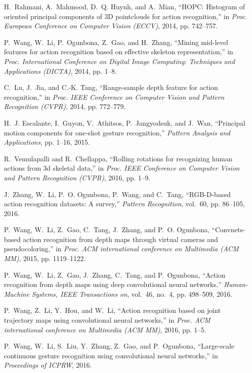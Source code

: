 \documentclass[10pt, a4paper, conference]{IEEEtran}
\begin{document}
\begin{thebibliography}{10}
H.~Rahmani, A.~Mahmood, D.~Q. Huynh, and A.~Mian, ``{HOPC}: Histogram of
  oriented principal components of {3D} pointclouds for action recognition,''
  in \emph{Proc. European Conference on Computer Vision (ECCV)}, 2014, pp.
  742--757.

P.~Wang, W.~Li, P.~Ogunbona, Z.~Gao, and H.~Zhang, ``Mining mid-level features
  for action recognition based on effective skeleton representation,'' in
  \emph{Proc. International Conference on Digital Image Computing: Techniques
  and Applications (DICTA)}, 2014, pp. 1--8.

C.~Lu, J.~Jia, and C.-K. Tang, ``Range-sample depth feature for action
  recognition,'' in \emph{Proc. IEEE Conference on Computer Vision and Pattern
  Recognition (CVPR)}, 2014, pp. 772--779.

H.~J. Escalante, I.~Guyon, V.~Athitsos, P.~Jangyodsuk, and J.~Wan, ``Principal
  motion components for one-shot gesture recognition,'' \emph{Pattern Analysis
  and Applications}, pp. 1--16, 2015.

R.~Vemulapalli and R.~Chellappa, ``Rolling rotations for recognizing human
  actions from 3d skeletal data,'' in \emph{Proc. IEEE Conference on Computer
  Vision and Pattern Recognition (CVPR)}, 2016, pp. 1--9.

J.~Zhang, W.~Li, P.~O. Ogunbona, P.~Wang, and C.~Tang, ``{RGB-D}-based action
  recognition datasets: A survey,'' \emph{Pattern Recognition}, vol.~60, pp.
  86--105, 2016.

P.~Wang, W.~Li, Z.~Gao, C.~Tang, J.~Zhang, and P.~O. Ogunbona, ``Convnets-based
  action recognition from depth maps through virtual cameras and
  pseudocoloring,'' in \emph{Proc. ACM international conference on Multimedia
  (ACM MM)}, 2015, pp. 1119--1122.

P.~Wang, W.~Li, Z.~Gao, J.~Zhang, C.~Tang, and P.~Ogunbona, ``Action
  recognition from depth maps using deep convolutional neural networks,''
  \emph{Human-Machine Systems, IEEE Transactions on}, vol.~46, no.~4, pp.
  498--509, 2016.

P.~Wang, Z.~Li, Y.~Hou, and W.~Li, ``Action recognition based on joint
  trajectory maps using convolutional neural networks,'' in \emph{Proc. ACM
  international conference on Multimedia (ACM MM)}, 2016, pp. 1--5.

P.~Wang, W.~Li, S.~Liu, Y.~Zhang, Z.~Gao, and P.~Ogunbona, ``Large-scale
  continuous gesture recognition using convolutional neural networks,'' in
  \emph{Proceedings of ICPRW}, 2016.


\end{thebibliography}
\end{document}
